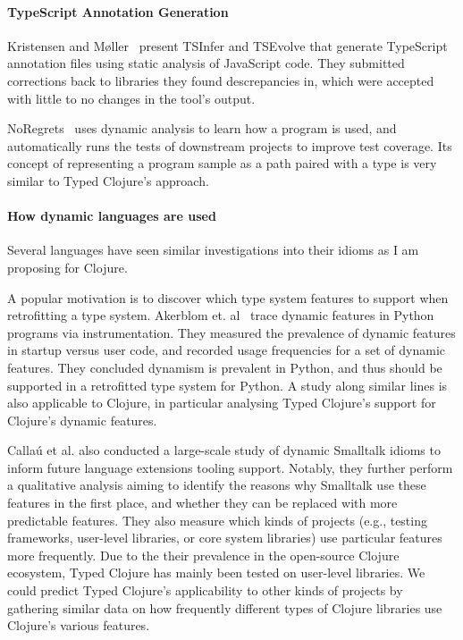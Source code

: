 \documentclass[9pt]{extarticle}
\begin{document}
\paragraph{TypeScript Annotation Generation}
Kristensen and M{\o}ller~\cite{kristensen2017inference}
present TSInfer and TSEvolve that generate TypeScript annotation
files using static analysis of JavaScript code. They
submitted corrections back to libraries they found descrepancies in,
which were accepted with little to no changes in the tool's output.

NoRegrets~\cite{noregrets2018} uses dynamic analysis to learn how a program
is used, and automatically runs the tests of downstream projects to
improve test coverage. Its concept of representing a program sample as
a path paired with a type is very similar to Typed Clojure's approach.

\paragraph{How dynamic languages are used}
Several languages have seen similar investigations
into their idioms as I am proposing for Clojure.

A popular motivation is to discover which type system features to support
when retrofitting a type system.
Akerblom et. al~\cite{Akerblom:2014:TDF:2597073.2597103} trace dynamic features in Python programs
via instrumentation. They measured the prevalence of dynamic features in startup versus
user code, and recorded usage frequencies for a set of dynamic features.
They concluded dynamism is prevalent in Python, and thus should be supported
in a retrofitted type system for Python.
A study along similar lines is also applicable to Clojure, in particular analysing Typed
Clojure's support for Clojure's dynamic features.

Calla{\'u} et al. \cite{Callau2013} also conducted a large-scale study of
dynamic Smalltalk idioms to inform future language extensions tooling support.
Notably, they further perform a qualitative analysis aiming to identify
the reasons why Smalltalk use these features in the first place, and
whether they can be replaced with more predictable features. They also 
measure which kinds of projects (e.g., testing frameworks, user-level libraries, or core system libraries) 
use particular features more frequently.
Due to the their prevalence in the open-source Clojure ecosystem,
Typed Clojure has mainly been tested on user-level libraries.
We could predict Typed Clojure's applicability to other kinds of projects
by gathering similar data on how frequently different types of Clojure libraries use
Clojure's various features.
\end{document}
